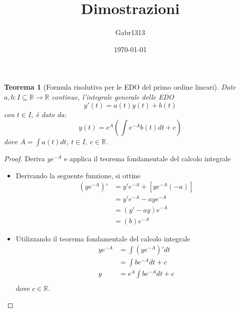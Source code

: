 \documentclass[12pt, a4paper]{article}
\title{Dimostrazioni}
\author{Gabr1313}
\date{\today}
\theoremstyle{break}
\newtheorem{theorem}{Teorema} %
\begin{document}
\justify
\sloppy
\maketitle
\listoftheorems

\newpage
{}
\begin{theorem} [Formula risolutiva per le EDO del primo ordine lineari]
	Date $a, b: I \subseteq \mathbb{R} \to \mathbb{R}$ continue,
	l'integrale generale delle EDO
	\[
		y'(t) = a(t) y(t) + b(t)
	\]
	con $t \in I $, è dato da:
	\[
		y(t) = e^A \left( \int e^{-A} b(t) dt + c \right)
	\]
	dove $A = \int a(t) dt$, $t \in I$, $c \in \mathbb{R}$.
\end{theorem}
\begin{proof} Deriva $y e^{-A}$ e applica il teorema fondamentale del calcolo
	integrale
	\begin{itemize}
		\item Derivando la seguente funzione, si ottine
		      \begin{align*}
			      (y e^{-A})' & = y' e^{-A} + [ye^{-A}(-a)] \\
			                  & = y' e^{-A} - aye^{-A}      \\
			                  & = (y' - ay)e^{-A}           \\
			                  & = (b)e^{-A}
		      \end{align*}
		\item Utilizzando il teorema fondamentale del calcolo integrale
		      \begin{align*}
			      y e^{-A} & = \int (y e^{-A})' dt     \\
			               & = \int be^{-A} dt + c     \\
			      y        & = e^A \int be^{-A} dt + c \\
		      \end{align*}
		      dove $c \in \mathbb{R}$.
	\end{itemize}
\end{proof}
\end{document}

